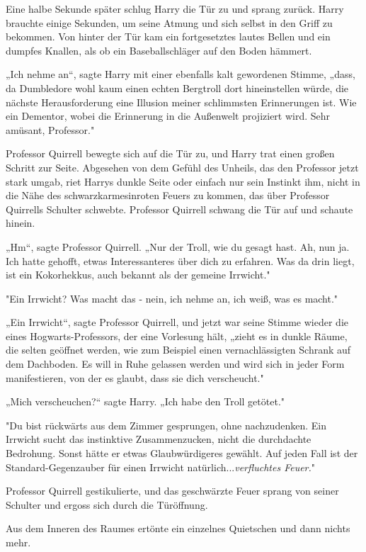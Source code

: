 {Eine halbe Sekunde später schlug Harry die Tür zu und sprang zurück. Harry brauchte einige Sekunden, um seine Atmung und sich selbst in den Griff zu bekommen. Von hinter der Tür kam ein fortgesetztes lautes Bellen und ein dumpfes Knallen, als ob ein Baseballschläger auf den Boden hämmert.

„Ich nehme an“, sagte Harry mit einer ebenfalls kalt gewordenen Stimme, „dass, da Dumbledore wohl kaum einen echten Bergtroll dort hineinstellen würde, die nächste Herausforderung eine Illusion meiner schlimmsten Erinnerungen ist. Wie ein Dementor, wobei die Erinnerung in die Außenwelt projiziert wird. Sehr amüsant, Professor."

Professor Quirrell bewegte sich auf die Tür zu, und Harry trat einen großen Schritt zur Seite. Abgesehen von dem Gefühl des Unheils, das den Professor jetzt stark umgab, riet Harrys dunkle Seite oder einfach nur sein Instinkt ihm, nicht in die Nähe des schwarzkarmesinroten Feuers zu kommen, das über Professor Quirrells Schulter schwebte. Professor Quirrell schwang die Tür auf und schaute hinein.

„Hm“, sagte Professor Quirrell. „Nur der Troll, wie du gesagt hast. Ah, nun ja. Ich hatte gehofft, etwas Interessanteres über dich zu erfahren. Was da drin liegt, ist ein Kokorhekkus, auch bekannt als der gemeine Irrwicht."

"Ein Irrwicht? Was macht das - nein, ich nehme an, ich weiß, was es macht."

„Ein Irrwicht“, sagte Professor Quirrell, und jetzt war seine Stimme wieder die eines Hogwarts-Professors, der eine Vorlesung hält, „zieht es in dunkle Räume, die selten geöffnet werden, wie zum Beispiel einen vernachlässigten Schrank auf dem Dachboden. Es will in Ruhe gelassen werden und wird sich in jeder Form manifestieren, von der es glaubt, dass sie dich verscheucht."

„Mich verscheuchen?“ sagte Harry. „Ich habe den Troll getötet."

"Du bist rückwärts aus dem Zimmer gesprungen, ohne nachzudenken. Ein Irrwicht sucht das instinktive Zusammenzucken, nicht die durchdachte Bedrohung. Sonst hätte er etwas Glaubwürdigeres gewählt. Auf jeden Fall ist der Standard-Gegenzauber für einen Irrwicht natürlich...\emph{verfluchtes Feuer.}"

Professor Quirrell gestikulierte, und das geschwärzte Feuer sprang von seiner Schulter und ergoss sich durch die Türöffnung.

Aus dem Inneren des Raumes ertönte ein einzelnes Quietschen und dann nichts mehr.

}
